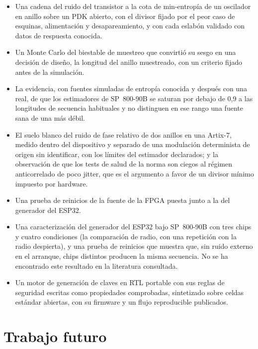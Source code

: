 \begin{itemize}
\item Una cadena del ruido del transistor a la cota de min-entropía de un
oscilador en anillo sobre un \ac{PDK} abierto, con el divisor fijado por
el peor caso de esquinas, alimentación y desapareamiento, y con cada
eslabón validado con datos de respuesta conocida.
\item Un Monte Carlo del biestable de muestreo que convirtió su sesgo en
una decisión de diseño, la longitud del anillo muestreado, con un
criterio fijado antes de la simulación.
\item La evidencia, con fuentes simuladas de entropía conocida y después
con una real, de que los estimadores de SP~800-90B se saturan por debajo
de 0,9 a las longitudes de secuencia habituales y no distinguen en ese
rango una fuente sana de una más débil.
\item El suelo blanco del ruido de fase relativo de dos anillos en una
Artix-7, medido dentro del dispositivo y separado de una modulación
determinista de origen sin identificar, con los
límites del estimador declarados; y la observación de que los tests de
salud de la norma son ciegos al régimen anticorrelado de poco jitter, que
es el argumento a favor de un divisor mínimo impuesto por hardware.
\item Una prueba de reinicios de la fuente de la \ac{FPGA} puesta junto a
la del generador del ESP32.
\item Una caracterización del generador del ESP32 bajo SP~800-90B con tres
chips y cuatro condiciones (la comparación de radio, con una repetición
con la radio despierta), y una prueba de reinicios que muestra que, sin
ruido externo en el arranque, chips distintos producen la misma
secuencia. No se ha encontrado este resultado en la literatura
consultada.
\item Un motor de generación de claves en RTL portable con sus reglas de
seguridad escritas como propiedades comprobadas, sintetizado sobre celdas
estándar abiertas, con su firmware y un flujo reproducible publicados.
\end{itemize}

\section{Trabajo futuro}

